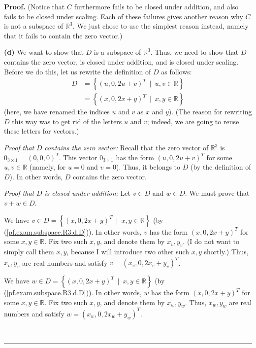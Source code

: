 \documentclass[numbers=enddot,12pt,final,onecolumn,notitlepage]{scrartcl}%
\theoremstyle{definition}
\newenvironment{proof}[1][Proof]{\noindent\textbf{#1.} }{\ \rule{0.5em}{0.5em}}
\begin{document}
\begin{proof}
(Notice that $C$ furthermore fails to be closed under addition, and also fails
to be closed under scaling. Each of these failures gives another reason why
$C$ is not a subspace of $\mathbb{R}^{3}$. We just chose to use the simplest
reason instead, namely that it fails to contain the zero vector.)

\textbf{(d)} We want to show that $D$ is a subspace of $\mathbb{R}^{3}$. Thus,
we need to show that $D$ contains the zero vector, is closed under addition,
and is closed under scaling. Before we do this, let us rewrite the definition
of $D$ as follows:%
\begin{align}
D  &  =\left\{  \left(  u,0,2u+v\right)  ^{T}\ \mid\ u,v\in\mathbb{R}\right\}
\nonumber\\
&  =\left\{  \left(  x,0,2x+y\right)  ^{T}\ \mid\ x,y\in\mathbb{R}\right\}
\label{pf.exam.subspace.R3.d.D}%
\end{align}
(here, we have renamed the indices $u$ and $v$ as $x$ and $y$). (The reason
for rewriting $D$ this way was to get rid of the letters $u$ and $v$; indeed,
we are going to reuse these letters for vectors.)

\textit{Proof that }$D$\textit{ contains the zero vector:} Recall that the
zero vector of $\mathbb{R}^{3}$ is $0_{3\times1}=\left(  0,0,0\right)  ^{T}$.
This vector $0_{3\times1}$ has the form $\left(  u,0,2u+v\right)  ^{T}$ for
some $u,v\in\mathbb{R}$ (namely, for $u=0$ and $v=0$). Thus, it belongs to $D$
(by the definition of $D$). In other words, $D$ contains the zero vector.

\textit{Proof that }$D$ \textit{is closed under addition:} Let $v\in D$ and
$w\in D$. We must prove that $v+w\in D$.

We have $v\in D=\left\{  \left(  x,0,2x+y\right)  ^{T}\ \mid\ x,y\in
\mathbb{R}\right\}  $ (by (\ref{pf.exam.subspace.R3.d.D})). In other words,
$v$ has the form $\left(  x,0,2x+y\right)  ^{T}$ for some $x,y\in\mathbb{R}$.
Fix two such $x,y$, and denote them by $x_{v},y_{v}$. (I do not want to simply
call them $x,y$, because I will introduce two other such $x,y$ shortly.) Thus,
$x_{v},y_{v}$ are real numbers and satisfy $v=\left(  x_{v},0,2x_{v}%
+y_{v}\right)  ^{T}$.

We have $w\in D=\left\{  \left(  x,0,2x+y\right)  ^{T}\ \mid\ x,y\in
\mathbb{R}\right\}  $ (by (\ref{pf.exam.subspace.R3.d.D})). In other words,
$w$ has the form $\left(  x,0,2x+y\right)  ^{T}$ for some $x,y\in\mathbb{R}$.
Fix two such $x,y$, and denote them by $x_{w},y_{w}$. Thus, $x_{w},y_{w}$ are
real numbers and satisfy $w=\left(  x_{w},0,2x_{w}+y_{w}\right)  ^{T}$.


\end{proof}
\end{document}
